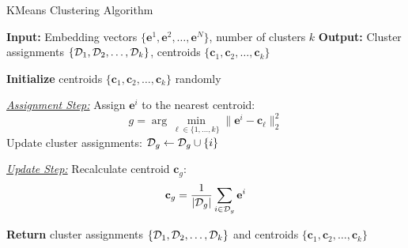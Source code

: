 \begin{algorithm}[H]
\caption{KMeans Clustering Algorithm}
\label{alg:KMeans}
\begin{algorithmic}[1]
\State \textbf{Input:} Embedding vectors $\{\mathbf{e}^1, \mathbf{e}^2, \ldots, \mathbf{e}^{N}\}$, number of clusters $k$
\State \textbf{Output:} Cluster assignments $\{\mathcal{D}_1, \mathcal{D}_2, \ldots, \mathcal{D}_k\}$, centroids $\{\mathbf{c}_1, \mathbf{c}_2, \ldots, \mathbf{c}_k\}$

\State \textbf{Initialize} centroids $\{\mathbf{c}_1, \mathbf{c}_2, \ldots, \mathbf{c}_k\}$ randomly

\Repeat
    \State \underline{\textit{Assignment Step:}}
        \State Assign $\mathbf{e}^i$ to the nearest centroid:
        \[
        g = \arg \min_{\ell\in\{1,...,k\}} \|\mathbf{e}^i - \mathbf{c}_{\ell}\|_{2}^2
        \]
        \State Update cluster assignments: $\mathcal{D}_{g} \leftarrow \mathcal{D}_{g} \cup \{i\}$
    \EndFor

    \State \underline{\textit{Update Step:}}
        \State Recalculate centroid $\mathbf{c}_g$:
        \[
        \mathbf{c}_g = \frac{1}{|\mathcal{D}_g|} \sum_{i \in \mathcal{D}_g} \mathbf{e}^i
        \]
    \EndFor
{}

\State \textbf{Return} cluster assignments $\{\mathcal{D}_1, \mathcal{D}_2, \ldots, \mathcal{D}_k\}$ and centroids $\{\mathbf{c}_1, \mathbf{c}_2, \ldots, \mathbf{c}_k\}$

\end{algorithmic}
\end{algorithm}
